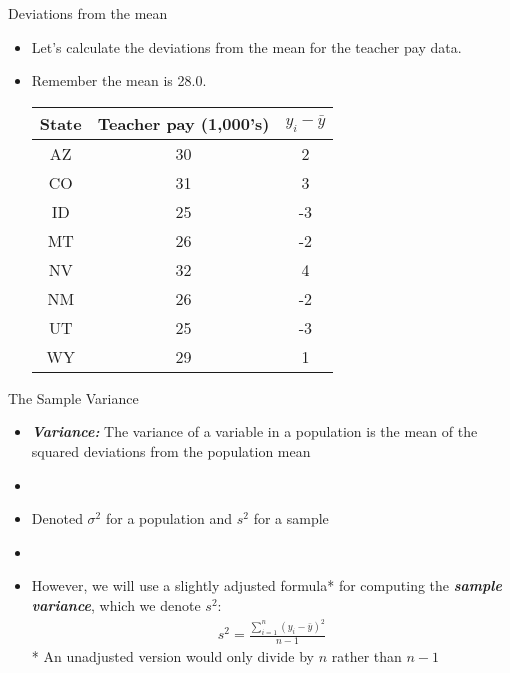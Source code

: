 \documentclass[xcolor=dvipsnames]{beamer}
\begin{document}
\begin{frame}{Deviations from the mean}
	\begin{itemize}
		\item Let's calculate the deviations from the mean for the teacher pay data.
		\item Remember the mean is 28.0.
\vspace{5 pt}
		\begin{center}
			\begin{tabular}{|c|c|c|}
				\hline 
				\textbf{State} & \textbf{Teacher pay (1,000's)} &  $y_i - \bar{y}$ \\ 
				\hline \hline
				AZ & 30 & 2\\ \hline 
				CO &  31 & 3\\ \hline 
				ID & 25  & -3\\  \hline 
				MT &  26 & -2\\ \hline 
				NV & 32 & 4\\ \hline 
				NM &  26 & -2\\ \hline 
				UT &  25 & -3\\ \hline 
				WY &  29 & 1\\ \hline 
			\end{tabular} 
		\end{center}
	\end{itemize}
\end{frame}

\begin{frame}{The Sample Variance}
\begin{itemize}
	\item \emph{\textbf{Variance:}} The variance of a variable in a population is the mean of the squared deviations from the population mean \pause
	\item[]
	\item Denoted $\sigma^2$ for a population and $s^2$ for a sample \pause
	\item[]
	\item However, we will use a slightly adjusted formula* for computing the \textbf{\emph{sample variance}}, which we denote $s^2$: \pause
	\begin{gather*}
		s^2 = \frac{\sum_{i=1}^n (y_i - \bar{y})^2}{n-1}
	\end{gather*} \pause
	* An unadjusted version would only divide by $n$ rather than $n-1$
\end{itemize}
\end{frame}
\end{document}
